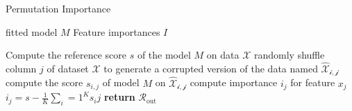 \documentclass[../../main.tex]{subfiles}
\begin{document}
\begin{algorithm}
    \caption{Permutation Importance}
    \label{alg:permutation_importance}
    \begin{algorithmic}[1]
        \REQUIRE fitted model $M$
        \ENSURE Feature importances $I$

        \STATE Compute the reference score $s$ of the model $M$ on data $\mathcal{X}$
                \STATE randomly shuffle column $j$ of dataset $\mathcal{X}$ to generate a corrupted version of the data named $\mathcal{\hat{X}_{i,j}}$
                \STATE compute the score $s_{i,j}$ of model $M$ on $\mathcal{\hat{X}_{i,j}}$
            \ENDFOR
            \STATE compute importance $i_j$ for feature $x_j$ $i_j = s - \frac{1}{K} \sum_i=1^K s_ij$
        \ENDFOR
        \STATE \textbf{return} $\mathcal{R}_{\text{out}}$
    \end{algorithmic}
 \end{algorithm}
\end{document}
